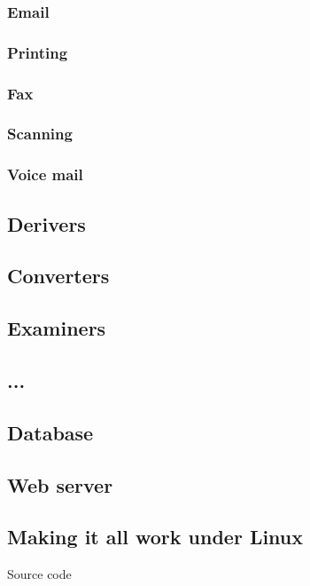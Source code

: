 \subsubsection{Email}
\subsubsection{Printing}
\subsubsection{Fax}
\subsubsection{Scanning}
\subsubsection{Voice mail}

\subsection{Derivers}

\subsection{Converters}

\subsection{Examiners}

\subsection{...}


\subsection{Database}

\subsection{Web server}

\subsection{Making it all work under Linux}
   
   Source code

